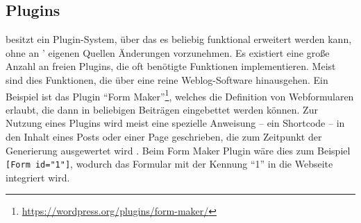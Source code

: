     \subsection{Plugins}
        \label{section:wordpressPlugins}
        {\wordpress} besitzt ein Plugin-System,
        über das es beliebig funktional erweitert werden kann,
        ohne an {\wordpress}' eigenen Quellen Änderungen vorzunehmen.
        Es existiert eine große Anzahl an freien Plugins,
        die oft benötigte Funktionen implementieren.
        Meist sind dies Funktionen, die über eine reine Weblog-Software hinausgehen.
        Ein Beispiel ist das Plugin
        "`Form Maker"'\footnote{\url{https://wordpress.org/plugins/form-maker/}},
        welches die Definition von Webformularen erlaubt,
        die dann in beliebigen Beiträgen eingebettet werden können.
        Zur Nutzung eines Plugins wird meist eine spezielle Anweisung -- ein Shortcode --
        in den Inhalt eines Posts oder einer Page geschrieben,
        die zum Zeitpunkt der Generierung ausgewertet wird
        \cite{wordpress:ShortcodeAPI}.
        Beim Form Maker Plugin wäre dies zum Beispiel \texttt{[Form id="1"]},
        wodurch das Formular mit der Kennung "`1"' in die Webseite integriert wird.
